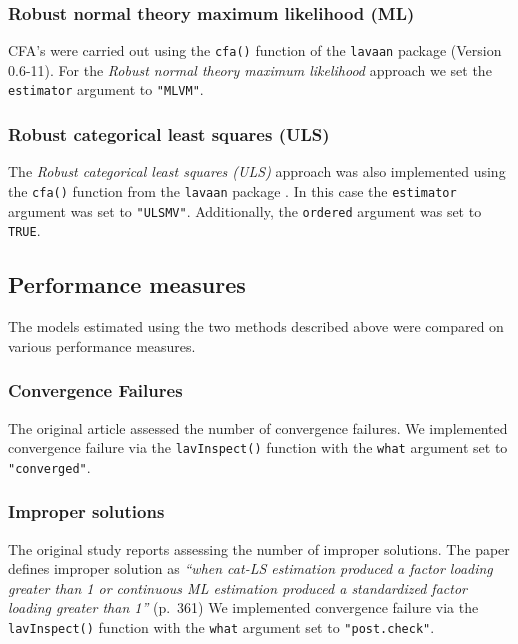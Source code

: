 \documentclass[10,a4paperpaper,]{article}
\begin{document}
\subsubsection{Robust normal theory maximum likelihood (ML)}

CFA's were carried out using the \texttt{cfa()} function of the
\texttt{lavaan} package (Version 0.6-11). For the \emph{Robust normal
theory maximum likelihood} approach we set the \texttt{estimator}
argument to \texttt{"MLVM"}.

\subsubsection{Robust categorical least squares (ULS)}

The \emph{Robust categorical least squares (ULS)} approach was also
implemented using the \texttt{cfa()} function from the \texttt{lavaan}
package . In this case the \texttt{estimator} argument was set to
\texttt{"ULSMV"}. Additionally, the \texttt{ordered} argument was set to
\texttt{TRUE}.

\subsection{Performance measures}

The models estimated using the two methods described above were compared
on various performance measures.

\subsubsection{Convergence Failures}

The original article assessed the number of convergence failures. We
implemented convergence failure via the \texttt{lavInspect()} function
with the \texttt{what} argument set to \texttt{"converged"}.

\subsubsection{Improper solutions}

The original study reports assessing the number of improper solutions.
The paper defines improper solution as \emph{``when cat-LS estimation
produced a factor loading greater than 1 or continuous ML estimation
produced a standardized factor loading greater than 1''} (p.~361) We
implemented convergence failure via the \texttt{lavInspect()} function
with the \texttt{what} argument set to \texttt{"post.check"}.
\end{document}
